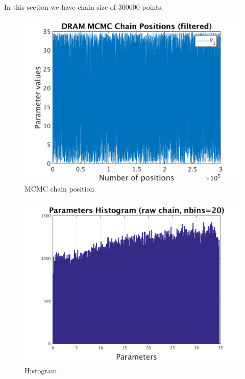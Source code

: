 In this section we have chain size of 300000 points. 

\begin{figure}[h!]
  
  \centering
   \includegraphics[scale=0.75]{output_300000/simple_ip_chain_pos_filt}
   \caption{MCMC chain position }
\end{figure}


\begin{figure}[h!]
  
  \centering
   \includegraphics[scale=0.75]{output_300000/simple_ip_hist_raw}
   \caption{Histogram}
\end{figure}

\clearpage

